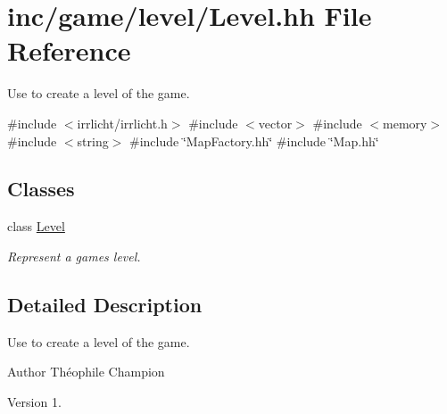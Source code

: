 \hypertarget{Level_8hh}{}\section{inc/game/level/\+Level.hh File Reference}
\label{Level_8hh}


Use to create a level of the game.  


{\ttfamily \#include $<$irrlicht/irrlicht.\+h$>$}\newline
{\ttfamily \#include $<$vector$>$}\newline
{\ttfamily \#include $<$memory$>$}\newline
{\ttfamily \#include $<$string$>$}\newline
{\ttfamily \#include \char`\"{}Map\+Factory.\+hh\char`\"{}}\newline
{\ttfamily \#include \char`\"{}Map.\+hh\char`\"{}}\newline
\subsection*{Classes}
\begin{DoxyCompactItemize}
\item 
class \hyperlink{classLevel}{Level}
\begin{DoxyCompactList}\small\item\em Represent a game\textquotesingle{}s level. \end{DoxyCompactList}\end{DoxyCompactItemize}


\subsection{Detailed Description}
Use to create a level of the game. 

\begin{DoxyAuthor}{Author}
Théophile Champion 
\end{DoxyAuthor}
\begin{DoxyVersion}{Version}
1. 
\end{DoxyVersion}
